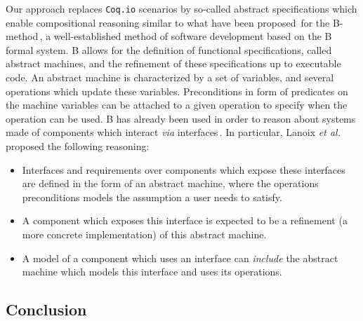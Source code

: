 Our approach replaces \texttt{Coq.io} scenarios by so-called abstract
specifications which enable compositional reasoning similar to what have been
proposed\,\cite{souquieres2005verifying,chouali2006proving,lanoix:hal-00105041}
for the B-method\,\cite{abrial2005b}, a well-established method of software
development based on the B formal system.
%
B allows for the definition of functional specifications, called abstract
machines, and the refinement of these specifications up to executable code.
%
An abstract machine is characterized by a set of variables, and several
operations which update these variables. Preconditions in form of predicates on
the machine variables can be attached to a given operation to specify when the
operation can be used.
%
B has already been used in order to reason about systems made of components
which interact \emph{via}
interfaces\,\cite{souquieres2005verifying,chouali2006proving,lanoix:hal-00105041}.
%
In particular, Lanoix \emph{et al.}\,\cite{lanoix:hal-00105041} proposed the
following reasoning:
%
\begin{itemize}
\item Interfaces and requirements over components which expose these interfaces
  are defined in the form of an abstract machine, where the operations
  preconditions models the assumption a user needs to satisfy.
\item A component which exposes this interface is expected to be a refinement (a
  more concrete implementation) of this abstract machine.
\item A model of a component which uses an interface can \emph{include} the
  abstract machine which models this interface and uses its
  operations. 
\end{itemize}

%

\subsection{Conclusion}
\label{subsec:sota:compconclu}

